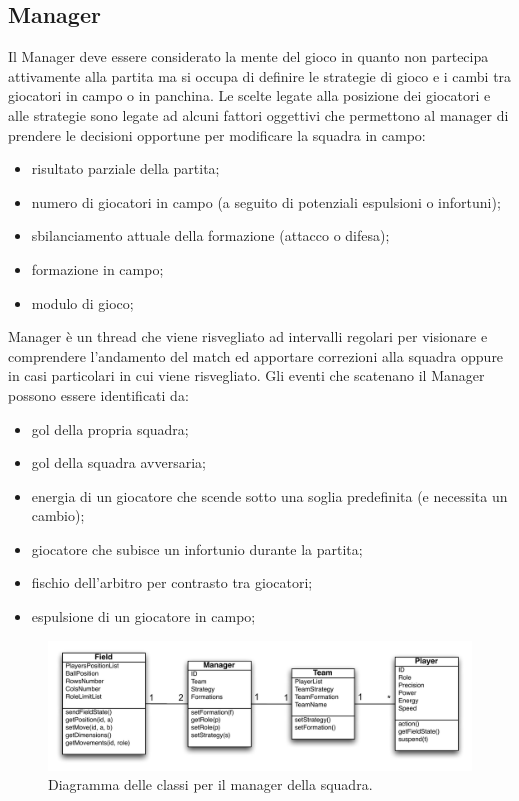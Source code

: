 \documentclass[aps,letterpaper,10pt]{article}
\begin{document}
\subsection{Manager}
\label{manager}

Il Manager deve essere considerato la mente del gioco in quanto non partecipa attivamente alla partita ma si occupa di
definire le strategie di gioco e i cambi tra giocatori in campo o in panchina. Le scelte legate alla posizione dei
giocatori e alle strategie sono legate ad alcuni fattori oggettivi che permettono al manager di prendere le decisioni
opportune per modificare la squadra in campo:

\begin{itemize}
	\item risultato parziale della partita;
	\item numero di giocatori in campo (a seguito di potenziali espulsioni o infortuni);
	\item sbilanciamento attuale della formazione (attacco o difesa);
	\item formazione in campo;
	\item modulo di gioco;
\end{itemize}

Manager \`e un thread che viene risvegliato ad intervalli regolari per visionare e comprendere l'andamento del match ed
apportare correzioni alla squadra oppure in casi particolari in cui viene risvegliato. Gli eventi che scatenano il
Manager possono essere identificati da:

\begin{itemize}
	\item gol della propria squadra;
	\item gol della squadra avversaria;
	\item energia di un giocatore che scende sotto una soglia predefinita (e necessita un cambio);
	\item giocatore che subisce un infortunio durante la partita;
	\item fischio dell'arbitro per contrasto tra giocatori;
	\item espulsione di un giocatore in campo;
\end{itemize}

\begin{figure}[H]
	\begin{center}
		\includegraphics[width=440px]{images/manager-class.pdf}
	\end{center}
\caption{Diagramma delle classi per il manager della squadra.}
\end{figure}
\end{document}
